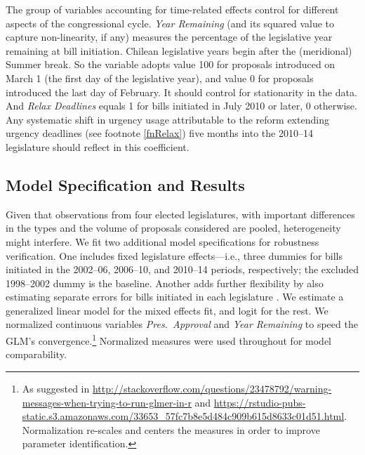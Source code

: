 \documentclass[letter,12pt]{article}
\begin{document}
The group of variables accounting for time-related effects control for different aspects of the congressional cycle. \emph{Year Remaining} (and its squared value to capture non-linearity, if any) measures the percentage of the legislative year remaining at bill initiation. Chilean legislative years begin after the (meridional) Summer break. So the variable adopts value 100 for proposals introduced on March 1 (the first day of the legislative year), and value 0 for proposals introduced the last day of February. It should control for stationarity in the data. And \emph{Relax Deadlines} equals 1 for bills initiated in July 2010 or later, 0 otherwise. Any systematic shift in urgency usage attributable to the reform extending urgency deadlines (see footnote \ref{fnRelax}) five months into the 2010--14 legislature should reflect in this coefficient. 

\subsection{Model Specification and Results}

Given that observations from four elected legislatures, with important differences in the types and the volume of proposals considered \citep{aleman.navia.UrgChi.2009} are pooled, heterogeneity might interfere. We fit two additional model specifications for robustness verification. One includes fixed legislature effects---i.e., three dummies for bills initiated in the 2002--06, 2006--10, and 2010--14 periods, respectively; the excluded 1998--2002 dummy is the baseline. Another adds further flexibility by also estimating separate errors for bills initiated in each legislature \citep[a so-called mixed effects model,][:262,302]{gelman.hill.2007}. We estimate a generalized linear model for the mixed effects fit, and logit for the rest. We normalized continuous variables \emph{Pres.~Approval} and \emph{Year Remaining} to speed the GLM's convergence.\footnote{As suggested in \url{http://stackoverflow.com/questions/23478792/warning-messages-when-trying-to-run-glmer-in-r} and \url{https://rstudio-pubs-static.s3.amazonaws.com/33653_57fc7b8e5d484c909b615d8633c01d51.html}. Normalization re-scales and centers the measures in order to improve parameter identification.} Normalized measures were used throughout for model comparability.

\end{document}
